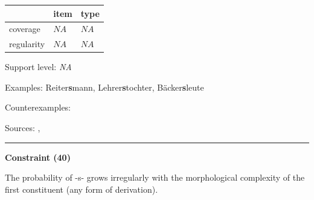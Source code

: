 \vspace{-0.25em}

\begin{table}[!ht]
\begin{center}
\setlength{\extrarowheight}{1pt}
\begin{tabularx}{\columnwidth}{|X|X|X|}
\hline
 & item & type \\
\hline
 coverage & $NA$ & $NA$ \\
\hline
 regularity & $NA$ & $NA$ \\
\hline
\end{tabularx}
\end{center}
\end{table}

\vspace{-1.35em}

\noindent
Support level: \textit{NA}

\vspace{0.3em}

\noindent
Examples: Reiter\textbf{s}mann, Lehrer\textbf{s}tochter, Bäcker\textbf{s}leute

\noindent
Counterexamples: 

\vspace{0.3em}

\noindent
Sources: \citet[11]{nuebling_szczepaniak_2008}, \citet[56]{ortner_mueller-bollhagen_1991}

\vspace{0.35em}
\hrule




\vspace{0.4em}

\begin{center}
\textbf{Constraint (40)}
\end{center}

\noindent
The probability of -s- grows irregularly with the morphological complexity of the first constituent (any form of derivation).
\vspace{0.5em}


